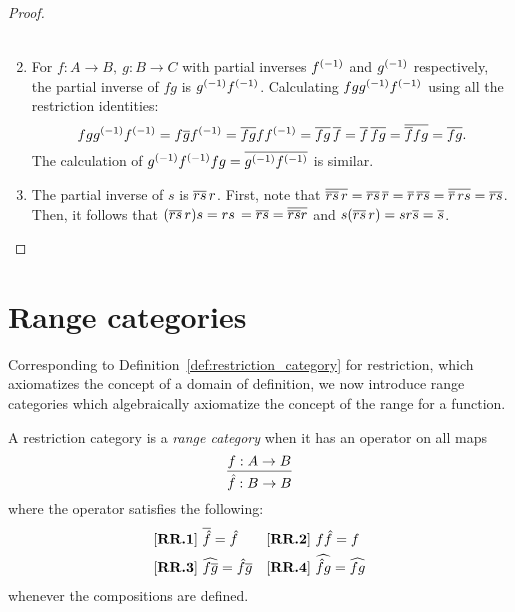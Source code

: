\begin{proof}
\begin{enumerate}[{(}i{)}]
\begin{multline*}
      \end{multline*}
    \item For $f:A\to B,\ g:B\to C$ with partial inverses ${f}^{(-1)}$ and ${g}^{(-1)}$ respectively,
      the partial inverse of $f g$ is ${g}^{(-1)} {f}^{(-1)}$. Calculating $f g {g}^{(-1)} {f}^{(-1)}$
      using all the restriction identities:
      \[
        f g {g}^{(-1)} {f}^{(-1)} = f \overline{g} {f}^{(-1)} = \overline{f g} f {f}^{(-1)} =
        \overline{f g}\, \overline{f} = \overline{f}\, \overline{f g} = \overline{\overline{f} f g} = \overline{f g}.
      \]
      The calculation of ${g}^{(-1)} {f}^{(-1)} f g = \overline{{g}^{(-1)} {f}^{(-1)}}$ is similar.
    \item The partial inverse of $s$ is $\overline{r s}\,r$. First, note
      that $\overline{\overline{r s}\,r}
      = \overline{r s}\,\overline{r}
      = \overline{r}\, \overline{r s}
      = \overline{\overline{r}\,r s}
      = \overline{r s}$.
      Then, it follows that $(\overline{r s}\,r) s
      = r s\,= \overline{r s}
      = \overline{\overline{r s}r} $ and
      $s (\restr{r s}\,r)
      = s r \restr{s} %
      = \restr{s}$.
  \end{enumerate}
\end{proof}


\section{Range categories} %
\label{sub:range_categories}
Corresponding to Definition~\ref{def:restriction_category} for restriction, which axiomatizes the
concept of a domain of definition, we now introduce range categories
\cite{guox:thesis,cockett-guo-hofstra-2012:range,cockett-guo-hofstra-2012:range2}
which algebraically axiomatize the concept of the range for a function.

\begin{definition}\label{def:range_category}
  A restriction category \X is a \emph{range category} when it has an operator on all maps
  \[
    \infer{\rg{f}:B\to B}{f:A\to B}
  \]
  where the operator satisfies the following:
  \begin{align*}
    &[\text{\bfseries {RR}.{1}}]\ \overline{\hat{f}} = \hat{f} & &
     [\text{\bfseries {RR}.{2}}]\ f \hat{f} = f\\
    &[\text{\bfseries {RR}.{3}}]\ \widehat{f\overline{g}} = \hat{f} \overline{g} & &
     [\text{\bfseries {RR}.{4}}]\  \widehat{\hat{f}g} = \widehat{f g}
  \end{align*}
  whenever the compositions are defined.

\end{definition}

